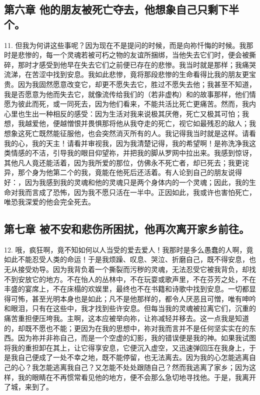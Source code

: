 
\subsection{第六章 他的朋友被死亡夺去，他想象自己只剩下半个。}

11. 但我为何讲这些事呢？因为现在不是提问的时候，而是向祢忏悔的时候。我那时是悲惨的，每一个灵魂若被可朽之物的友谊所捆绑，当他失去它们时，便会被撕碎，那时才感受到他早在失去它们之前便已存在的悲惨。我当时就是那样；我痛哭流涕，在苦涩中找到安息。我如此悲惨，竟将那段悲惨的生命看得比我的朋友更宝贵。因为我固然愿意改变它，却更不愿失去它，胜过不愿失去他；我甚至不知道，我是否愿意为他而失去它，就像流传给我们的（若非虚构）和的故事那样，他们情愿为彼此而死，或一同死去，因为他们看来，不能共活比死亡更痛苦。然而，我内心里也生出一种相反的感受：因为生活对我来说极其厌倦，死亡又极其可怕；我想，我越爱他，便越憎恨并畏惧那将他从我夺走的死亡，视它如最残忍的敌人；我想象这死亡既然能征服他，也会突然消灭所有的人。我记得我当时就是这样。请看我的心，我的天主！请看并审视我，因为我清楚记得，我的希望啊！是祢洗净我这类情感的不洁，引导我的眼目仰望祢，并把我的脚从罗网中拉出来。我感到惊讶，其他凡人竟还能活着，因为我所爱的那位，仿佛永不死亡者，却已死去；我更诧异，那个身为他第二个的我，竟能在他死后还活着。有人论到自己的朋友说得好：，因为我感到我的灵魂和他的灵魂只是两个身体内的一个灵魂；因此，我的生命对我而言成了恐怖，因为我不愿只活在一半中。正因如此，我或许也害怕死亡，唯恐我深爱的他会完全死去。\par


\subsection{第七章 被不安和悲伤所困扰，他再次离开家乡前往。}

12. 哦，疯狂啊，竟不知如何以人当受的爱去爱人！我那时是多么愚蠢的人啊，竟如此不能忍受人类的命运！于是我烦躁、叹息、哭泣、折磨自己，既不得安息，也无从接受劝导。因为我背负着一个撕裂而污秽的灵魂，无法忍受它被我背负，却找不到安放它的地方。不在怡人的丛林中，不在玩耍或歌声里，不在芬芳之处，不在丰盛的宴席上，不在床榻的欢娱里，最终也不在书籍和诗歌中找到安息。一切都显得可怖，甚至光明本身也是如此；凡不是他那样的，都令人厌恶且可憎，唯有呻吟和眼泪，只有在这些中，我才找到些许安息。但每当我的灵魂被拉离它们，沉重的痛苦重担便压垮我。主啊，这本应被举向祢，让祢减轻并移去。这一点我是知道的，却既不愿也不能；更因为在我的思想中，祢对我而言并不是任何坚实实在的东西。因为祢并非祢自己，而是一个空虚的幻影，我的错误便是我的神。如果我试图将我的重担卸在其上，让它得享安息，它便沉入虚空，又迅速弹回压在我身上，于是我自己便成了一处不幸之地，既不能停留，也无法离去。因为我的心怎能逃离自己的心？我怎能逃离我自己？又怎能不处处跟随自己？然而我逃离了家乡；因为这样，我的眼睛在不再惯常看见他的地方，便不会那么急切地寻找他。于是，我离开了城，来到了。\par

